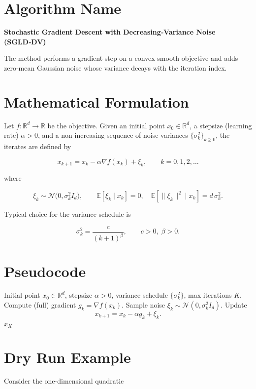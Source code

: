 \documentclass{article}
\newcommand{\E}{\mathbb{E}}
\begin{document}
\section*{Algorithm Name}
\textbf{Stochastic Gradient Descent with Decreasing‑Variance Noise (SGLD‑DV)}  

The method performs a gradient step on a convex smooth objective and adds zero‑mean Gaussian noise whose variance decays with the iteration index.

\section*{Mathematical Formulation}
Let $f:\mathbb{R}^{d}\rightarrow\mathbb{R}$ be the objective.  
Given an initial point $x_{0}\in\mathbb{R}^{d}$, a stepsize (learning rate) $\alpha>0$, and a non‑increasing sequence of noise variances $\{\sigma_{k}^{2}\}_{k\ge 0}$, the iterates are defined by  

\[
\boxed{
x_{k+1}=x_{k}-\alpha \nabla f(x_{k})+\xi_{k},\qquad k=0,1,2,\dots
}
\tag{1}
\]

where  

\[
\xi_{k}\sim\mathcal{N}\!\bigl(0,\sigma_{k}^{2}I_{d}\bigr),\qquad 
\E[\xi_{k}\mid x_{k}]=0,\quad 
\E[\|\xi_{k}\|^{2}\mid x_{k}]=d\,\sigma_{k}^{2}.
\]

Typical choice for the variance schedule is  

\[
\sigma_{k}^{2}= \frac{c}{(k+1)^{\beta}},\qquad c>0,\; \beta>0 .
\tag{2}
\]

\section*{Pseudocode}
\begin{algorithm}[H]
\caption{SGLD‑DV}
\begin{algorithmic}[1]
\REQUIRE Initial point $x_{0}\in\mathbb{R}^{d}$, stepsize $\alpha>0$, variance schedule $\{\sigma_{k}^{2}\}$, max iterations $K$.
    \STATE Compute (full) gradient $g_{k}= \nabla f(x_{k})$.
    \STATE Sample noise $\xi_{k}\sim\mathcal{N}(0,\sigma_{k}^{2}I_{d})$.
    \STATE Update 
    \[
    x_{k+1}=x_{k}-\alpha g_{k}+\xi_{k}.
    \]
\ENDFOR
\RETURN $x_{K}$
\end{algorithmic}
\end{algorithm}

\section*{Dry Run Example}
Consider the one‑dimensional quadratic  
\end{document}
